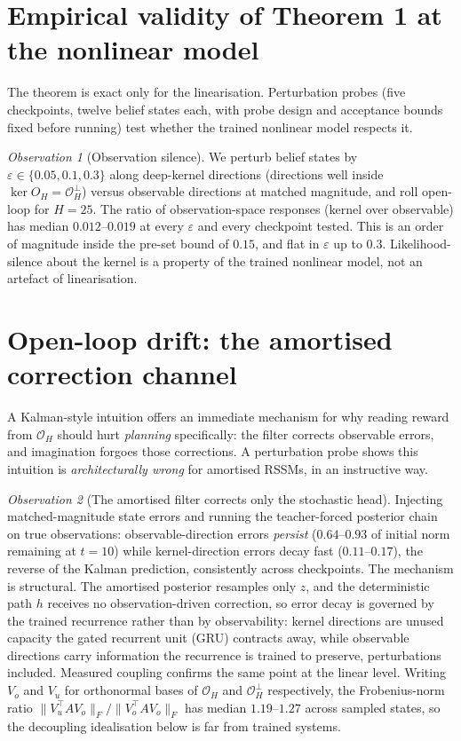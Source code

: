 \documentclass[11pt]{article}
\theoremstyle{remark}
\newtheorem{observation}{Observation}
\newcommand{\Obs}{\mathcal{O}}
\begin{document}
\section{Empirical validity of Theorem 1 at the nonlinear model}

The theorem is exact only for the linearisation. Perturbation probes (five checkpoints, twelve belief states each, with probe design and acceptance bounds fixed before running) test whether the trained nonlinear model respects it.

\begin{observation}[Observation silence]\label{obs:d1}
We perturb belief states by $\varepsilon \in \{0.05, 0.1, 0.3\}$ along deep-kernel directions (directions well inside $\ker O_H = \Obs_H^\perp$) versus observable directions at matched magnitude, and roll open-loop for $H=25$. The ratio of observation-space responses (kernel over observable) has median $0.012$--$0.019$ at every $\varepsilon$ and every checkpoint tested. This is an order of magnitude inside the pre-set bound of $0.15$, and flat in $\varepsilon$ up to $0.3$. Likelihood-silence about the kernel is a property of the trained nonlinear model, not an artefact of linearisation.
\end{observation}

\section{Open-loop drift: the amortised correction channel}\label{sec:drift}

A Kalman-style intuition offers an immediate mechanism for why reading reward from $\Obs_H$ should hurt \emph{planning} specifically: the filter corrects observable errors, and imagination forgoes those corrections. A perturbation probe shows this intuition is \emph{architecturally wrong} for amortised RSSMs, in an instructive way.

\begin{observation}[The amortised filter corrects only the stochastic head]\label{obs:d2}
Injecting matched-magnitude state errors and running the teacher-forced posterior chain on true observations: observable-direction errors \emph{persist} ($0.64$--$0.93$ of initial norm remaining at $t=10$) while kernel-direction errors decay fast ($0.11$--$0.17$), the reverse of the Kalman prediction, consistently across checkpoints. The mechanism is structural. The amortised posterior resamples only $z$, and the deterministic path $h$ receives no observation-driven correction, so error decay is governed by the trained recurrence rather than by observability: kernel directions are unused capacity the gated recurrent unit (GRU) contracts away, while observable directions carry information the recurrence is trained to preserve, perturbations included. Measured coupling confirms the same point at the linear level. Writing $V_o$ and $V_u$ for orthonormal bases of $\Obs_H$ and $\Obs_H^\perp$ respectively, the Frobenius-norm ratio $\lVert V_u^\top A V_o\rVert_F / \lVert V_o^\top A V_o\rVert_F$ has median $1.19$--$1.27$ across sampled states, so the decoupling idealisation below is far from trained systems.
\end{observation}
\end{document}
